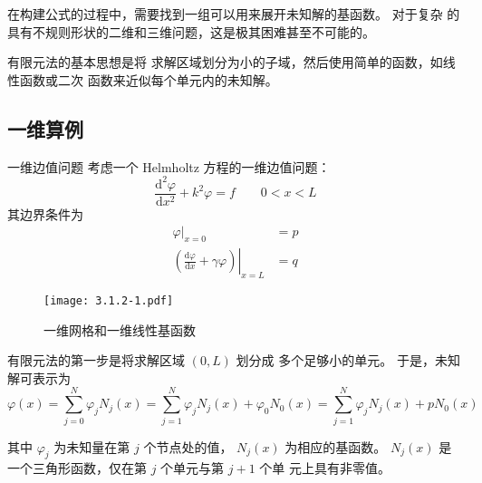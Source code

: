 \par 在构建公式的过程中，需要找到一组可以用来展开未知解的基函数。
对于复杂
的具有不规则形状的二维和三维问题，这是极其困难甚至不可能的。
\par 有限元法的基本思想是将
求解区域划分为小的子域，然后使用简单的函数，如线性函数或二次
函数来近似每个单元内的未知解。

\subsection{一维算例}

\begin{definition}{一维边值问题}
    考虑一个 Helmholtz 方程的一维边值问题：
    \begin{equation}
        \frac{\text{d}^2\varphi}{\text{d}x^2} + k^2\varphi = f
        \qquad 0<x<L
        \label{一维Helmholtz}
    \end{equation}
    其边界条件为
    \begin{align}
        \label{一维边界条件-1}
        \left.\varphi\right|_{x=0} &= p \\
        \label{一维边界条件-2}
        \left.\left(
            \frac{\text{d}\varphi}{\text{d}x} + \gamma\varphi
        \right)\right|_{x=L} &= q
    \end{align}
\end{definition}

\begin{figure}[!htbp]
    \centering
    \texttt{[image: 3.1.2-1.pdf]}
    \caption{一维网格和一维线性基函数}
    \label{一维网格和一维线性基函数}
\end{figure}

\par 有限元法的第一步是将求解区域 $(0,L)$ 划分成
多个足够小的单元。
于是，未知解可表示为
\begin{equation}
    \varphi(x) = \sum_{j=0}^{N} \varphi_j N_j(x)
    =\sum_{j=1}^{N} \varphi_j N_j(x)
    +\varphi_0 N_0(x)
    =\sum_{j=1}^{N} \varphi_j N_j(x)
    +p N_0(x)
    \label{一维基函数展开}
\end{equation}
\par 其中 $\varphi_j$ 为未知量在第 $j$ 个节点处的值，
$N_j(x)$ 为相应的基函数。
$N_j(x)$ 是一个三角形函数，仅在第 $j$ 个单元与第 $j+1$ 个单
元上具有非零值。

